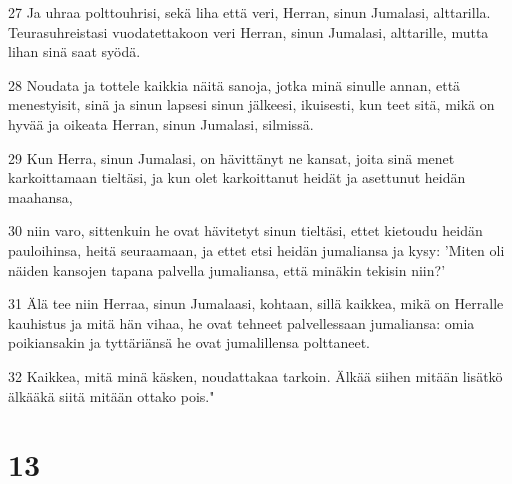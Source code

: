 \par 27 Ja uhraa polttouhrisi, sekä liha että veri, Herran, sinun Jumalasi, alttarilla. Teurasuhreistasi vuodatettakoon veri Herran, sinun Jumalasi, alttarille, mutta lihan sinä saat syödä.
\par 28 Noudata ja tottele kaikkia näitä sanoja, jotka minä sinulle annan, että menestyisit, sinä ja sinun lapsesi sinun jälkeesi, ikuisesti, kun teet sitä, mikä on hyvää ja oikeata Herran, sinun Jumalasi, silmissä.
\par 29 Kun Herra, sinun Jumalasi, on hävittänyt ne kansat, joita sinä menet karkoittamaan tieltäsi, ja kun olet karkoittanut heidät ja asettunut heidän maahansa,
\par 30 niin varo, sittenkuin he ovat hävitetyt sinun tieltäsi, ettet kietoudu heidän pauloihinsa, heitä seuraamaan, ja ettet etsi heidän jumaliansa ja kysy: 'Miten oli näiden kansojen tapana palvella jumaliansa, että minäkin tekisin niin?'
\par 31 Älä tee niin Herraa, sinun Jumalaasi, kohtaan, sillä kaikkea, mikä on Herralle kauhistus ja mitä hän vihaa, he ovat tehneet palvellessaan jumaliansa: omia poikiansakin ja tyttäriänsä he ovat jumalillensa polttaneet.
\par 32 Kaikkea, mitä minä käsken, noudattakaa tarkoin. Älkää siihen mitään lisätkö älkääkä siitä mitään ottako pois."

\chapter{13}

